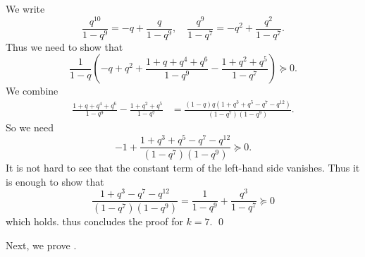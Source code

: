 \documentclass[12pt,reqno]{amsart}
\renewcommand{\(}{\left\(}
\renewcommand{\)}{\right\)}
\numberwithin{equation}{section}
\theoremstyle{plain}
\theoremstyle{definition}
\numberwithin{equation}{section}
\begin{document}
We write
\[
\frac{q^{10}}{1-q^9}=-q+\frac{q}{1-q^9},\quad \frac{q^{9}}{1-q^7}=-q^2+\frac{q^2}{1-q^7}.
\]
Thus we need to show that
\[
\frac{1}{1-q}\left(-q+q^2+\frac{1 + q+q^4+q^6}{1-q^9}-\frac{1 + q^2+q^5}{1-q^7}\right)\succeq 0.
\]
We combine 
\begin{align*}
\frac{1\!+\!q\!+\!q^4\!+\!q^6}{1\!-\!q^9}\!-\!\frac{1\!+\! q^2\!+\!q^5}{1\!-\!q^7}%
&=\frac{\left(1\!-\!q\right) q \left(1\!+\!q^3\!+\!q^5\!-\!q^7\!-\!q^{12}\right)}{\left(1\!-\!q^7\right)\left(1\!-\!q^9\right)}.
\end{align*}
So we need
\[
-1+\frac{1 + q^3 + q^5 - q^7 - q^{12}}{\left(1-q^7\right)\left(1-q^9\right)}\succeq 0.
\]
It is not hard to see that the constant term of the left-hand side vanishes. Thus it is enough to show that
\[
\frac{1 + q^3  - q^7 - q^{12}}{\left(1-q^7\right)\left(1-q^9\right)}=\frac{1}{1-q^9}+\frac{q^3}{1-q^7}\succeq 0
\]
which holds. thus concludes the proof for $k=7$. \qed 

\phantom{.}

 Next, we prove .
\end{document}
